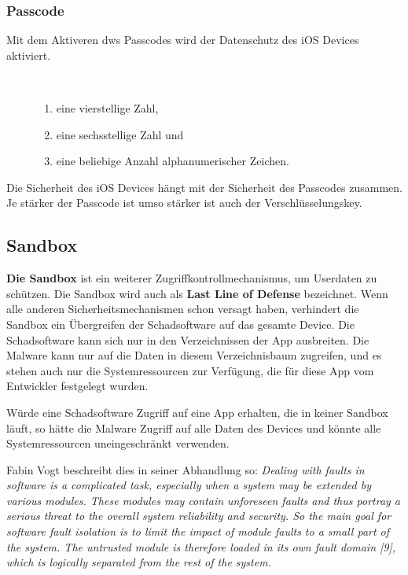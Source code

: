 \subsubsection{Passcode}
\label{sec:Passcode}

Mit dem Aktiveren dws Passcodes wird der Datenschutz des iOS Devices aktiviert. 
\begin{description}
    \item[\parbox{\textwidth} {Der User hat die Möglichkeit, zwischen drei Einstellungsvarianten des Passcodes zu variieren}]~\par
   \begin{enumerate}
        \item eine vierstellige Zahl,
        \item eine sechsstellige Zahl und
        \item eine beliebige Anzahl alphanumerischer Zeichen.
    \end{enumerate}
\end{description} 

Die Sicherheit des iOS Devices hängt mit der Sicherheit des Passcodes zusammen. Je stärker der Passcode ist umso stärker ist auch der Verschlüsselungskey. 

\subsection{Sandbox}
\label{sec:Sandbox}

\textbf{Die Sandbox} ist ein weiterer Zugriffkontrollmechanismus, um Userdaten zu schützen. Die Sandbox wird auch als \textbf{Last Line of Defense} bezeichnet. Wenn alle anderen Sicherheitsmechanismen schon versagt haben, verhindert die Sandbox ein Übergreifen der Schadsoftware auf das gesamte Device. Die Schadsoftware kann sich nur in den Verzeichnissen der App ausbreiten. Die Malware kann nur auf die Daten in diesem Verzeichnisbaum zugreifen, und es stehen auch nur die Systemressourcen zur Verfügung, die für diese App vom Entwickler festgelegt wurden. \par
Würde eine Schadsoftware Zugriff auf eine App erhalten, die in keiner Sandbox läuft, so hätte die Malware Zugriff auf alle Daten des Devices und könnte alle Systemressourcen uneingeschränkt verwenden.\par
Fabin Vogt beschreibt dies in seiner Abhandlung so: \textit{\glqq Dealing with faults in software is a complicated task, especially when a system may be extended by various modules. These modules may contain unforeseen faults and thus portray a serious threat to the overall system reliability and security. So the main goal for software fault isolation is to limit the impact of module faults to a small part of the system. The untrusted module is therefore loaded in its own fault domain [9], which is logically separated from the rest of the system.\grqq{}} \cite{Sandbox[4]}

